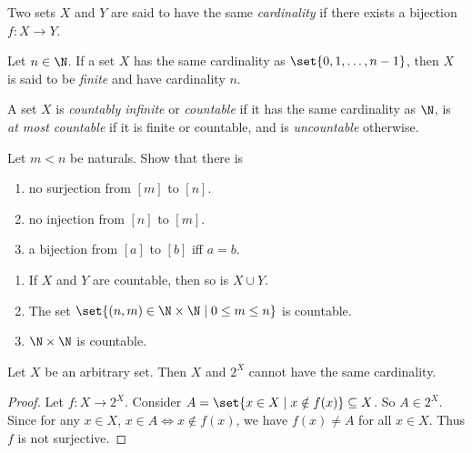 \begin{definition}
    Two sets $X$ and $Y$ are said to have the same \emph{cardinality} if
    there exists a bijection $f\colon X \to Y$.

    Let $n \in \N$.
    If a set $X$ has the same cardinality as $\set{0, 1, \ldots, n - 1}$,
    then $X$ is said to be \emph{finite} and have cardinality $n$.
\end{definition}

\begin{definition}
    A set $X$ is \emph{countably infinite} or \emph{countable} if it has the
    same cardinality as $\N$, is \emph{at most countable} if it is finite or
    countable, and is \emph{uncountable} otherwise.
\end{definition}
\begin{exercise}
    Let $m < n$ be naturals.
    Show that there is
    \begin{enumerate}
        \item no surjection from $[m]$ to $[n]$\footnotemark.
        \item no injection from $[n]$ to $[m]$.
        \item a bijection from $[a]$ to $[b]$ iff $a = b$.
    \end{enumerate}
\end{exercise}

\begin{exercise} \leavevmode
    \begin{enumerate}
        \item If $X$ and $Y$ are countable, then so is $X \cup Y$.
        \item The set $\set{(n, m) \in \N \times \N \mid 0 \le m \le n}$ is
            countable.
        \item $\N \times \N$ is countable.
    \end{enumerate}
\end{exercise}
\begin{theorem}
    Let $X$ be an arbitrary set.
    Then $X$ and $2^X$ cannot have the same cardinality.
\end{theorem}
\begin{proof}
    Let $f\colon X \to 2^X$.
    Consider $A = \set{x \in X \mid x \notin f(x)} \subseteq X$.
    So $A \in 2^X$.
    Since for any $x \in X$, $x \in A \iff x \notin f(x)$, we have
    $f(x) \ne A$ for all $x \in X$.
    Thus $f$ is not surjective.
\end{proof}
